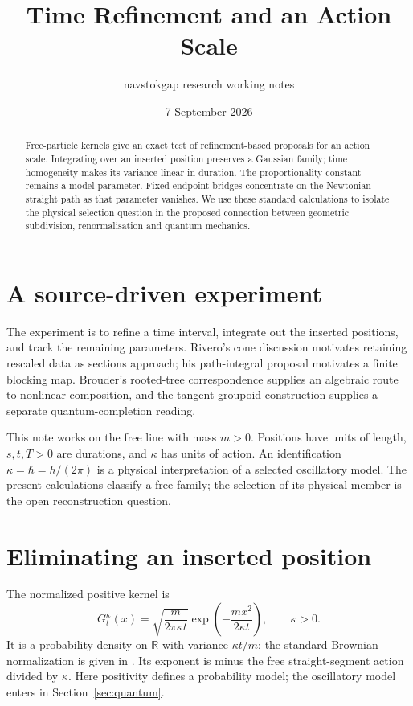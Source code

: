 \documentclass[11pt,a4paper]{article}
\title{Time Refinement and an Action Scale}
\author{navstokgap research working notes}
\date{7 September 2026}
\begin{document}
\maketitle
\begin{abstract}
Free-particle kernels give an exact test of refinement-based proposals for an
action scale. Integrating over an inserted position preserves a Gaussian family;
time homogeneity makes its variance linear in duration. The proportionality
constant remains a model parameter. Fixed-endpoint bridges concentrate on the
Newtonian straight path as that parameter vanishes. We use these standard
calculations to isolate the physical selection question in the proposed
connection between geometric subdivision, renormalisation and quantum mechanics.
\end{abstract}

\section{A source-driven experiment}
The experiment is to refine a time interval, integrate out the inserted
positions, and track the remaining parameters. Rivero's cone discussion
\cite{RiveroCone1999} motivates retaining rescaled data as sections approach;
his path-integral proposal \cite{RiveroFeynman1998} motivates a finite blocking
map. Brouder's rooted-tree correspondence \cite{Brouder1999} supplies an
algebraic route to nonlinear composition, and the tangent-groupoid construction
\cite{CarinenaEtAl1999} supplies a separate quantum-completion reading.

This note works on the free line with mass $m>0$. Positions have units of
length, $s,t,T>0$ are durations, and $\kappa$ has units of action.
An identification $\kappa=\hbar=h/(2\pi)$ is a physical interpretation of a
selected oscillatory model. The present calculations classify a free family;
the selection of its physical member is the open reconstruction question.

\section{Eliminating an inserted position}
The normalized positive kernel is
\begin{equation}\label{eq:kernel}
 G_t^\kappa(x)=\sqrt{\frac{m}{2\pi\kappa t}}
 \exp\left(-\frac{mx^2}{2\kappa t}\right),\qquad \kappa>0.
\end{equation}
It is a probability density on $\mathbb R$ with variance $\kappa t/m$;
the standard Brownian normalization is given in
\cite[\S4.1, (23)--(25)]{PitmanYor2018}.
Its exponent is minus the free straight-segment action divided by $\kappa$.
Here positivity defines a probability model; the oscillatory model enters
in Section~\ref{sec:quantum}.
\end{document}
